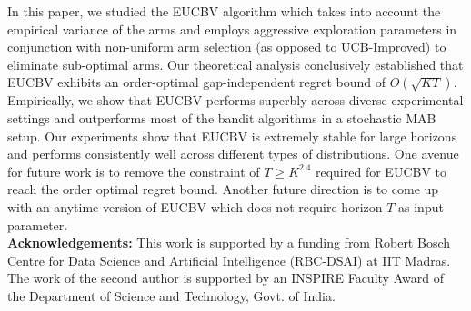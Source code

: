 In this paper, we studied the EUCBV algorithm which takes into account the empirical variance of the arms and employs aggressive exploration parameters in conjunction with non-uniform arm selection (as opposed to UCB-Improved) to eliminate sub-optimal arms. Our theoretical analysis conclusively established that EUCBV exhibits an order-optimal gap-independent regret bound of $O(\sqrt{KT})$. Empirically, we show that EUCBV performs superbly across diverse experimental settings and outperforms most of the bandit algorithms in a stochastic MAB setup. Our experiments show that EUCBV is extremely stable for large horizons and performs consistently well across different types of distributions. One avenue for future work is to remove the constraint of $T\geq K^{2.4}$ required for EUCBV to reach the order optimal regret bound. Another future direction is to come up with an anytime version of EUCBV which does not require horizon $T$ as input parameter. \\

\textbf{Acknowledgements:} This work is supported by a funding from Robert
Bosch Centre for Data Science and Artificial Intelligence (RBC-DSAI) at IIT Madras. The work of the second author is supported by an INSPIRE Faculty Award of the Department of Science and Technology, Govt. of India. 

%
